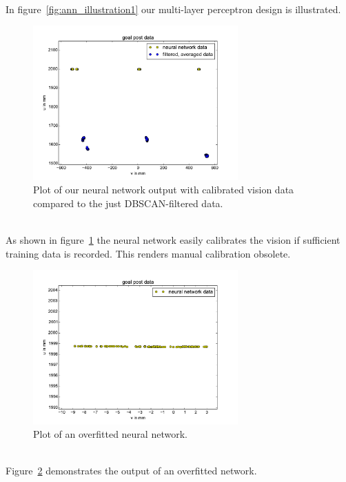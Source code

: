 \documentclass[lnicst,a4paper]{svmultln}
\begin{document}
\\
In figure~\ref{fig:ann_illustration1} our multi-layer perceptron design is illustrated.
\\
\begin{figure}
 	\centerline{\includegraphics[width=0.7\textwidth]{ann_plot1.pdf}}
	{\caption{Plot of our neural network output with calibrated vision data compared to the just DBSCAN-filtered data.}\label{fig:ann_plot1}}
\end{figure}
\\
As shown in figure~\ref{fig:ann_plot1} the neural network easily calibrates the vision if sufficient training data is recorded. This renders manual calibration obsolete.
\\
\begin{figure}
 	\centerline{\includegraphics[width=0.7\textwidth]{ann_plot2.pdf}}
	{\caption{Plot of an overfitted neural network.}\label{fig:ann_plot2}}
\end{figure}
\\
Figure~\ref{fig:ann_plot2} demonstrates the output of an overfitted network.




\end{document}
